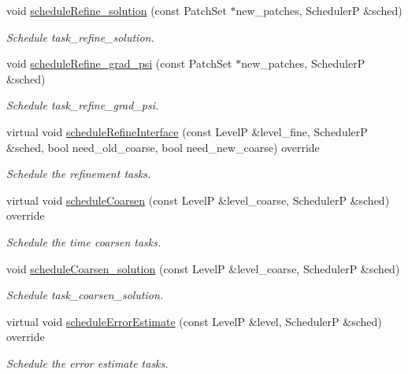 \begin{DoxyCompactItemize}
void \hyperlink{classUintah_1_1PhaseField_1_1PureMetal_a5cade3bd6819bfdded02d339a6ea2642}{schedule\+Refine\+\_\+solution} (const Patch\+Set $\ast$new\+\_\+patches, SchedulerP \&sched)
\begin{DoxyCompactList}\small\item\em Schedule task\+\_\+refine\+\_\+solution. \end{DoxyCompactList}\item 
void \hyperlink{classUintah_1_1PhaseField_1_1PureMetal_ac72766b53d2bda11d81ea361638d6408}{schedule\+Refine\+\_\+grad\+\_\+psi} (const Patch\+Set $\ast$new\+\_\+patches, SchedulerP \&sched)
\begin{DoxyCompactList}\small\item\em Schedule task\+\_\+refine\+\_\+grad\+\_\+psi. \end{DoxyCompactList}\item 
virtual void \hyperlink{classUintah_1_1PhaseField_1_1PureMetal_a3198fbaa73fbcb094f12b806a7c5caff}{schedule\+Refine\+Interface} (const LevelP \&level\+\_\+fine, SchedulerP \&sched, bool need\+\_\+old\+\_\+coarse, bool need\+\_\+new\+\_\+coarse) override
\begin{DoxyCompactList}\small\item\em Schedule the refinement tasks. \end{DoxyCompactList}\item 
virtual void \hyperlink{classUintah_1_1PhaseField_1_1PureMetal_a7497127d260530ffd5cad90d5f3be2db}{schedule\+Coarsen} (const LevelP \&level\+\_\+coarse, SchedulerP \&sched) override
\begin{DoxyCompactList}\small\item\em Schedule the time coarsen tasks. \end{DoxyCompactList}\item 
void \hyperlink{classUintah_1_1PhaseField_1_1PureMetal_ace0a1e8ac16c5903a67c2debce869bc3}{schedule\+Coarsen\+\_\+solution} (const LevelP \&level\+\_\+coarse, SchedulerP \&sched)
\begin{DoxyCompactList}\small\item\em Schedule task\+\_\+coarsen\+\_\+solution. \end{DoxyCompactList}\item 
virtual void \hyperlink{classUintah_1_1PhaseField_1_1PureMetal_a3c662077070517adee6f60b1b7a26039}{schedule\+Error\+Estimate} (const LevelP \&level, SchedulerP \&sched) override
\begin{DoxyCompactList}\small\item\em Schedule the error estimate tasks. \end{DoxyCompactList}\item 

\end{DoxyCompactItemize}
